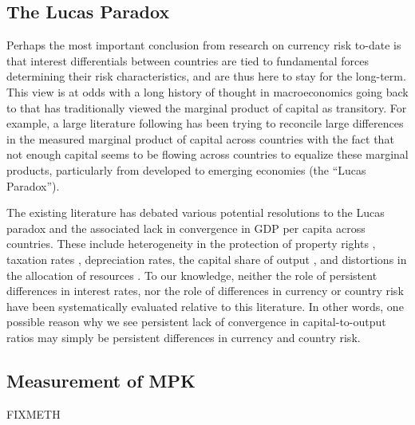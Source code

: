\documentclass{ar-1col}
\begin{document}
\subsection{The Lucas Paradox}

Perhaps the most important conclusion from research on currency risk to-date is that interest differentials between countries are tied to fundamental forces determining their risk characteristics, and are thus here to stay for the long-term. This view is at odds with a long history of thought in macroeconomics going back to \cite{solow1956contribution} that has traditionally viewed the marginal product of capital as transitory. 
For example, a large literature following \citet{Lucas1990} has been trying to reconcile large differences in the measured marginal product of capital across countries with the fact that not enough capital seems to be flowing across countries to equalize these marginal products, particularly from developed to emerging economies (the ``Lucas Paradox''). 

The existing literature has debated various potential resolutions to the Lucas paradox and the associated lack in convergence in GDP per capita across countries. These include heterogeneity in the protection of property rights \citep{HallJones1997}, taxation rates \citep{Jorgenson1996}, depreciation rates, the capital share of output \citep{Neiman2014}, and distortions in the allocation of resources \citep{HsiehKlenow2009}. 
To our knowledge, neither the role of persistent differences in interest rates, nor the role of differences in currency or country risk have been systematically evaluated relative to this literature. In other words, one possible reason why we see persistent lack of convergence in capital-to-output ratios may simply be persistent differences in currency and country risk.


\subsection{Measurement of MPK}

FIXMETH
\end{document}
